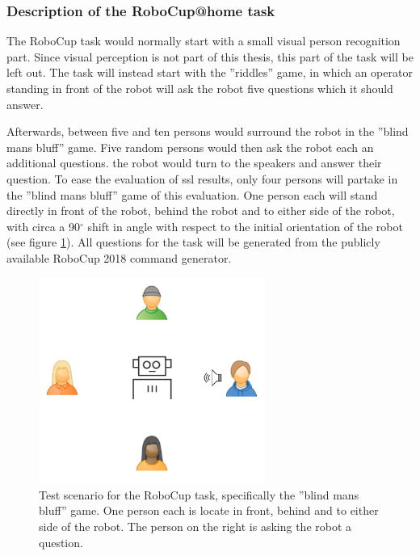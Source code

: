 \subsubsection{Description of the RoboCup@home task}
The RoboCup task would normally start with a small visual person recognition part.
Since visual perception is not part of this thesis, this part of the task will be left out.
The task will instead start with the ''riddles'' game, in which an operator standing in front of the robot will ask the robot five questions which it should answer.

Afterwards, between five and ten persons would surround the robot in the ''blind mans bluff'' game.
Five random persons would then ask the robot each an additional questions.
the robot would turn to the speakers and answer their question.
To ease the evaluation of \gls{ssl} results, only four persons will partake in the ''blind mans bluff'' game of this evaluation.
One person each will stand directly in front of the robot, behind the robot and to either side of the robot, with circa a 90$^\circ$ shift in angle with respect to the initial orientation of the robot (see figure \ref{pic:eval_task}).
All questions for the task will be generated from the publicly available RoboCup 2018 command generator.



\begin{figure}[]
	\centering
	\includegraphics[width=0.66\textwidth]{diagrams/robocup_task_t1.pdf}
	\caption{Test scenario for the RoboCup task, specifically the ''blind mans bluff'' game. 
		One person each is locate in front, behind and to either side of the robot.
		The person on the right is asking the robot a question.}
	\label{pic:eval_task}
\end{figure}

